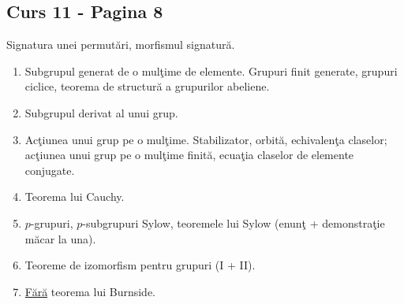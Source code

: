 
\subsection*{Curs 11 - Pagina 8}

\noindent\hspace*{2em} Signatura unei permut\u{a}ri, morfismul signatur\u{a}.

\begin{enumerate}
\item[(12)] Subgrupul generat de o mul\c{t}ime de elemente. Grupuri finit generate,
grupuri ciclice, teorema de structur\u{a} a grupurilor abeliene.
\item[(13)] Subgrupul derivat al unui grup.
\item[(14)] Ac\c{t}iunea unui grup pe o mul\c{t}ime. Stabilizator, orbit\u{a},
echivalen\c{t}a claselor; ac\c{t}iunea unui grup pe o mul\c{t}ime finit\u{a},
ecua\c{t}ia claselor de elemente conjugate.
\item[(15)] Teorema lui Cauchy.
\item[(16)] $p$-grupuri, $p$-subgrupuri Sylow, teoremele lui Sylow
(enun\c{t} + demonstra\c{t}ie m\u{a}car la una).
\item[(17)] Teoreme de izomorfism pentru grupuri (I + II).
\item[(18)] \underline{F\u{a}r\u{a}} teorema lui Burnside.
\end{enumerate}

